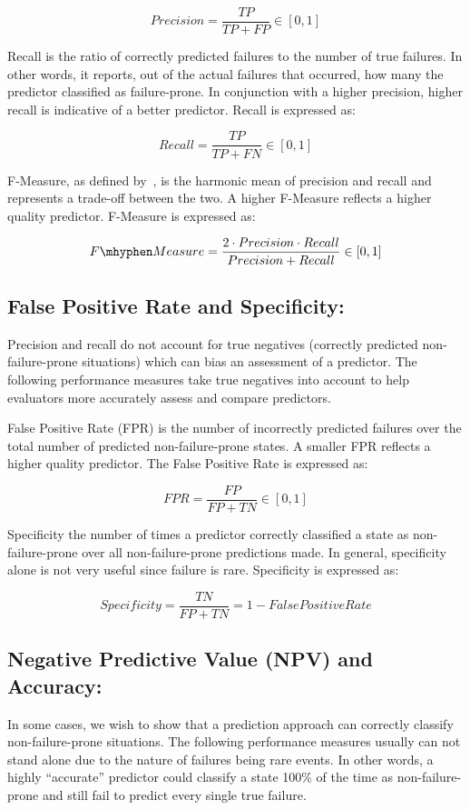 \[ Precision 
	= \dfrac{TP}{TP + FP} \in [0,1]
\]

Recall is the ratio of correctly predicted failures to the number of true
failures.  In other words, it reports, out of the actual failures that
occurred, how many the predictor classified as failure-prone.  In conjunction
with a higher precision, higher recall is indicative of a better predictor.
Recall is expressed as:

\[ Recall 
	= \dfrac{TP}{TP + FN} \in [0,1]
\]

F-Measure, as defined by~\cite{rijsbergen1979v}, is the harmonic mean of
precision and recall and represents a trade-off between the two.  A higher
F-Measure reflects a higher quality predictor.  F-Measure is expressed as:

\[ F\mhyphen Measure 
	= \dfrac{2 \cdot Precision \cdot Recall}{Precision + Recall} \in [0,1]
\]

\subsection{False Positive Rate and Specificity:}
Precision and recall do not account for true negatives (correctly predicted
non-failure-prone situations) which can bias an assessment of a predictor.  The
following performance measures take true negatives into account to help
evaluators more accurately assess and compare predictors.

False Positive Rate (FPR) is the number of incorrectly predicted failures over
the total number of predicted non-failure-prone states.  A smaller FPR reflects
a higher quality predictor.  The False Positive Rate is expressed as:

\[ \mathit{FPR}
	= \dfrac{FP}{FP + TN} \in [0,1]
\]

Specificity the number of times a predictor correctly classified a state as
non-failure-prone over all non-failure-prone predictions made.  In general,
specificity alone is not very useful since failure is rare.  Specificity is
expressed as:

\[ Specificity 
	= \dfrac{TN}{FP + TN} = 1 - False Positive Rate
\]

\subsection{Negative Predictive Value (NPV) and Accuracy:}
In some cases, we wish to show that a prediction approach can correctly
classify non-failure-prone situations.  The following performance measures 
usually can not stand alone due to the nature of failures being rare events.
In other words, a highly ``accurate'' predictor could classify a state 100\% of
the time as non-failure-prone and still fail to predict every single true
failure.

